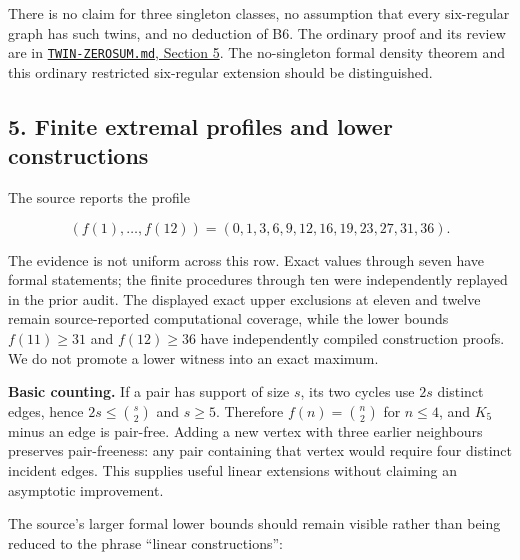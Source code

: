 \documentclass[
  11pt,
]{article}
\begin{document}
There is no claim for three singleton classes, no assumption that every
six-regular graph has such twins, and no deduction of B6. The ordinary
proof and its review are in
\href{https://github.com/roberthuynh/erdos-585/blob/1efc324e155ef0b6a7081c5f695c6c825e7debef/findings/supplement/papers/twin-core/TWIN-ZEROSUM.md}{\texttt{TWIN-ZEROSUM.md},
Section 5}. The no-singleton formal density theorem and this ordinary
restricted six-regular extension should be distinguished.

\subsection{5. Finite extremal profiles and lower
constructions}\label{finite-extremal-profiles-and-lower-constructions}

The source reports the profile

\[
(f(1),\ldots,f(12))=(0,1,3,6,9,12,16,19,23,27,31,36).
\]

The evidence is not uniform across this row. Exact values through seven
have formal statements; the finite procedures through ten were
independently replayed in the prior audit. The displayed exact upper
exclusions at eleven and twelve remain source-reported computational
coverage, while the lower bounds \(f(11)\geq31\) and \(f(12)\geq36\)
have independently compiled construction proofs. We do not promote a
lower witness into an exact maximum.

\textbf{Basic counting.} If a pair has support of size \(s\), its two
cycles use \(2s\) distinct edges, hence \(2s\leq\binom{s}{2}\) and
\(s\geq5\). Therefore \(f(n)=\binom n2\) for \(n\leq4\), and \(K_5\)
minus an edge is pair-free. Adding a new vertex with three earlier
neighbours preserves pair-freeness: any pair containing that vertex
would require four distinct incident edges. This supplies useful linear
extensions without claiming an asymptotic improvement.

The source's larger formal lower bounds should remain visible rather
than being reduced to the phrase ``linear constructions'':
\end{document}
